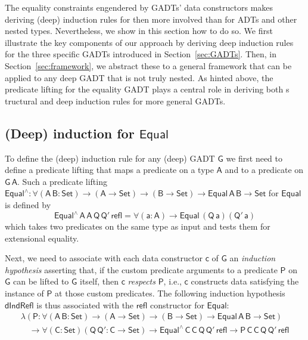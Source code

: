 \documentclass[9pt]{entcs}
\begin{document}
The equality constraints engendered by GADTs' data constructors makes
deriving (deep) induction rules for then more involved than for ADTs
and other nested types. Nevertheless, we show in this section how to
do so. We first illustrate the key components of our approach by
deriving deep induction rules for the three specific GADTs introduced
in Section~\ref{sec:GADTs}. Then, in Section~\ref{sec:framework}, we
abstract these to a general framework that can be applied to any deep
GADT that is not truly nested. As hinted above, the predicate lifting
for the equality GADT plays a central role in deriving both s
tructural and deep induction rules for more general GADTs.
 
\subsection{(Deep) induction for $\mathsf{Equal}$}\label{sec:ind-equal}

To define the (deep) induction rule for any (deep) GADT $\mathsf{G}$
we first need to define a predicate lifting that maps a predicate on a
type $\mathsf{A}$ and to a predicate on $\mathsf{G\,A}$. Such a
predicate lifting
$\mathsf{Equal^{\wedge} : \forall (A\,B : Set) \to (A \to Set) \to (B
  \to Set) \to Equal\,A\,B \to Set}$
for $\mathsf{Equal}$ is defined by
\[\mathsf{Equal^{\wedge}\,A\,A\,Q\,Q'\,refl = \forall (a : A) \to
  Equal\,(Q\,a)(Q'\,a)}\]
which takes two predicates on the same type as input and tests them
for extensional equality.

Next, we need to associate with each data constructor $\mathsf{c}$ of
$\mathsf{G}$ an {\em induction hypothesis} asserting that, if the
custom predicate arguments to a predicate $\mathsf{P}$ on $\mathsf{G}$
can be lifted to $\mathsf{G}$ itself, then $\mathsf{c}$ {\em respects}
$\mathsf{P}$, i.e., $\mathsf{c}$ constructs data satisfying the
instance of $\mathsf{P}$ at those custom predicates. The following
induction hypothesis $\mathsf{dIndRefl}$ is thus associated with the
$\mathsf{refl}$ constructor for $\mathsf{Equal}$:
\begin{equation*}\label{eq:ind-refl}
\begin{array}{l}
\mathsf{\lambda (P : \forall (A\,B : Set) \to (A \to Set) \to (B \to
  Set) \to Equal\,A\,B \to Set)} \\ 
\quad\mathsf{\to \forall (C : Set) (Q\, Q' : C \to Set) \to
  Equal^{\wedge}\,C\,C\,Q\,Q'\,refl \to P\,C\,C\,Q\,Q'\,refl} 
\end{array}
\end{equation*}
\end{document}
